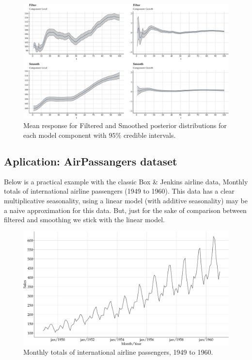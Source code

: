 \documentclass[
]{article}
\begin{document}
\begin{figure}

{\centering \includegraphics[width=0.9\linewidth]{pybats_detection_files/figure-latex/unnamed-chunk-13-1} 

}

\caption{Mean response for Filtered and Smoothed posterior distributions for each model component with $95\%$ credible intervals.}\label{fig:unnamed-chunk-13}
\end{figure}

\hypertarget{aplication-airpassangers-dataset}{%
\subsection{Aplication: AirPassangers
dataset}\label{aplication-airpassangers-dataset}}

Below is a practical example with the classic Box \& Jenkins airline
data, Monthly totals of international airline passengers (1949 to 1960).
This data has a clear multiplicative seasonality, using a linear model
(with additive seasonality) may be a naive approximation for this data.
But, just for the sake of comparison between filtered and smoothing we
stick with the linear model.

\begin{figure}

{\centering \includegraphics[width=0.9\linewidth]{pybats_detection_files/figure-latex/unnamed-chunk-14-1} 

}

\caption{Monthly totals of international airline passengers, 1949 to 1960.}\label{fig:unnamed-chunk-14}
\end{figure}
\end{document}
